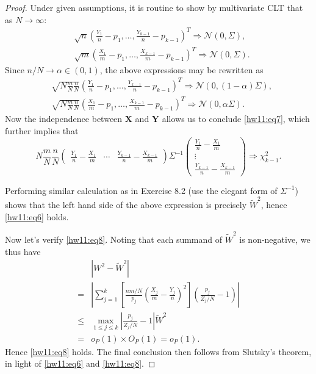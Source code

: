 \documentclass{article}
\newcommand{\gaussian}{\mathcal{N}}
\theoremstyle{definition}
\theoremstyle{plain}
\theoremstyle{remark}
\begin{document}
\begin{description}
\begin{proof}
Under given assumptions, it is routine to show by multivariate CLT that as $N \to \infty$:
\begin{align*}
    & \sqrt{n}\left(\frac{Y_1}{n} - p_1, \ldots, \frac{Y_{k - 1}}{n} - p_{k -
    1}\right)^T \Rightarrow \gaussian(0, \Sigma), \\
    & \sqrt{m}\left(\frac{X_1}{m} - p_1, \ldots, \frac{X_{k - 1}}{m} - p_{k -
    1}\right)^T \Rightarrow \gaussian(0, \Sigma).
\end{align*}
Since $n/N \to \alpha \in (0, 1)$, the above expressions may be rewritten as
\begin{align*}
    & \sqrt{N\frac{m}{N}\frac{n}{N}}\left(\frac{Y_1}{n} - p_1, \ldots, \frac{Y_{k - 1}}{n} - p_{k -
    1}\right)^T \Rightarrow \gaussian(0, (1 - \alpha)\Sigma), \\
    & \sqrt{N\frac{m}{N}\frac{n}{N}}\left(\frac{X_1}{m} - p_1, \ldots, \frac{X_{k - 1}}{m} - p_{k -
    1}\right)^T \Rightarrow \gaussian(0, \alpha\Sigma).
\end{align*}
Now the independence between $\bm{X}$ and $\bm{Y}$ allows us to conclude 
\eqref{hw11:eq7}, which further implies that 
\begin{equation*}
    N\frac{m}{N}\frac{n}{N}
    \begin{pmatrix} \frac{Y_1}{n} - \frac{X_1}{m} & \cdots & 
    \frac{Y_{k - 1}}{n} - \frac{X_{k - 1}}{m}\end{pmatrix}
    \Sigma^{-1}
    \begin{pmatrix}\frac{Y_1}{n} - \frac{X_1}{m} \\ \vdots \\
    \frac{Y_{k - 1}}{n} - \frac{X_{k - 1}}{m}\end{pmatrix}
    \Rightarrow \chi_{k - 1}^2.
\end{equation*}

Performing similar calculation as in Exercise 8.2 (use the elegant form of $\Sigma^{-1}$) shows that the left hand side of the above expression is precisely
$\tilde{W}^2$, hence \eqref{hw11:eq6} holds. 

Now let's verify \eqref{hw11:eq8}. Noting that each summand of $\tilde{W}^2$ is non-negative, we thus have
\begin{align*}
    & |W^2 - \tilde{W}^2| \\
  = & \left|\sum_{j = 1}^k \left[\frac{nm/N}{p_j}\left(\frac{X_j}{m} -
  \frac{Y_j}{n}\right)^2\right]\left(\frac{p_j}{Z_j/N} - 1\right)\right| \\
  \leq & \max\limits_{1 \leq j \leq k}\left|\frac{p_j}{Z_j/N} - 1\right|\tilde{W}^2 \\
  = & o_P(1)\times O_P(1) = o_P(1).
\end{align*}
Hence \eqref{hw11:eq8} holds. The final conclusion then follows from Slutsky's theorem,
in light of \eqref{hw11:eq6} and \eqref{hw11:eq8}.
\end{proof}
\end{description}
\end{document}
